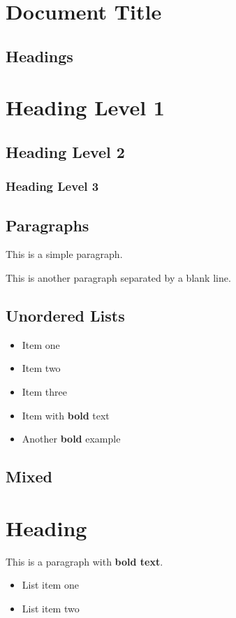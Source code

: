 \documentclass{article}
\begin{document}
\section{ Document Title}

\subsection{ Headings}

\section{ Heading Level 1}

\subsection{ Heading Level 2}

\subsubsection{ Heading Level 3}

\subsection{ Paragraphs}

This is a simple paragraph.

This is another paragraph separated by a blank line.

\subsection{ Unordered Lists}

\begin{itemize}
\item  Item one
\item  Item two
\item  Item three
\end{itemize}

\begin{itemize}
\item  Item with \textbf{bold} text
\item  Another \textbf{bold} example
\end{itemize}

\subsection{ Mixed}

\section{ Heading}

This is a paragraph with \textbf{bold text}.

\begin{itemize}
\item  List item one
\item  List item two
\end{itemize}
\end{document}
